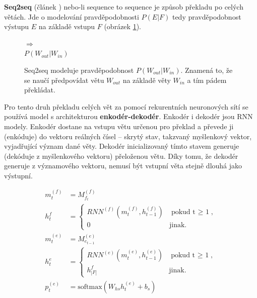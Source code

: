 \textbf{Seq2seq} (článek \cite{seq2seq}) nebo-li sequence to sequence je způsob překladu po celých větách. Jde o modelování pravděpodobnosti $P(E|F)$ tedy pravděpodobnost výstupu $E$ na základě vstupu $F$ (obrázek \ref{figure:seqProbability}).

\begin{figure}[H]
    \begin{center}
        \setlength{\fboxsep}{8pt}
        $\Longrightarrow$
        \\ \vspace{5mm}
        $P(W_{out}|W_{in})$
    \end{center}
	\caption{Seq2seq modeluje pravděpodobnost $P(W_{out}|W_{in})$. Znamená to, že se naučí předpovídat větu $W_{out}$ na základě věty $W_{in}$ a tím pádem překládat.}
	\label{figure:seqProbability}
\end{figure}

Pro tento druh překladu celých vět za pomocí rekurentních neuronových sítí se používá model s architekturou \textbf{enkodér-dekodér}. Enkodér i dekodér jsou RNN modely. Enkodér dostane na vstupu větu určenou pro překlad a převede ji (enkóduje) do vektoru reálných čísel -- skrytý stav, takzvaný myšlenkový vektor, vyjadřující význam dané věty. Dekodér inicializovaný tímto stavem generuje (dekóduje z myšlenkového vektoru) přeloženou větu. Díky tomu, že dekodér generuje z významového vektoru, nemusí být vstupní věta stejně dlouhá jako výstupní.


\begin{align}
    m^{(f)}_{t}&=M^{(f)}_{f_t}\label{figure:encoderEmb} \\
    h^{f}_{t}&=\begin{cases}
                    RNN^{(f)}(m^{(f)}_{t},h^{(f)}_{t-1}) & \mbox{pokud t $\geq$ 1},\label{figure:encoderState} \\
                    0 & \mbox{jinak}.
                \end{cases}\\
    m^{(e)}_{t}&=M^{(e)}_{e_{t-1}}\label{figure:decoderEmb} \\
    h^{e}_{t}&=\begin{cases}
                    RNN^{(e)}(m^{(e)}_{t},h^{(e)}_{t-1}) & \mbox{pokud t $\geq$ 1},\\
                    h^{f}_{|F|} & \mbox{jinak}.
                \end{cases}\label{figure:decoderState} \\
    p^{(e)}_{t}&=\mbox{softmax}(W_{hs}h^{(e)}_{t} + b_{s}) \label{figure:resultSoftmax}
\end{align}


